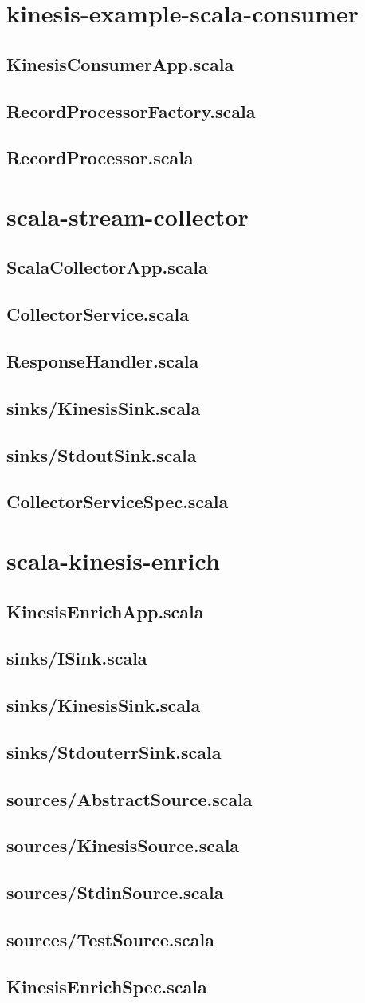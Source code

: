 \documentclass[12pt]{article}
\begin{document}
\tableofcontents

\section{kinesis-example-scala-consumer}
\newcommand{\filesrc}[1]{\subsection{#1}
  
}
\filesrc{KinesisConsumerApp.scala}
\filesrc{RecordProcessorFactory.scala}
\filesrc{RecordProcessor.scala}

\section{scala-stream-collector}
\renewcommand{\filesrc}[1]{\subsection{#1}
  
}
\newcommand{\filetest}[1]{\subsection{#1}
  
}
\filesrc{ScalaCollectorApp.scala}
\filesrc{CollectorService.scala}
\filesrc{ResponseHandler.scala}
\filesrc{sinks/KinesisSink.scala}
\filesrc{sinks/StdoutSink.scala}
\filetest{CollectorServiceSpec.scala}

\section{scala-kinesis-enrich}
\renewcommand{\filesrc}[1]{\subsection{#1}
  
}
\renewcommand{\filetest}[1]{\subsection{#1}
  
}
\filesrc{KinesisEnrichApp.scala}
\filesrc{sinks/ISink.scala}
\filesrc{sinks/KinesisSink.scala}
\filesrc{sinks/StdouterrSink.scala}
\filesrc{sources/AbstractSource.scala}
\filesrc{sources/KinesisSource.scala}
\filesrc{sources/StdinSource.scala}
\filesrc{sources/TestSource.scala}
\filetest{KinesisEnrichSpec.scala}
\end{document}
